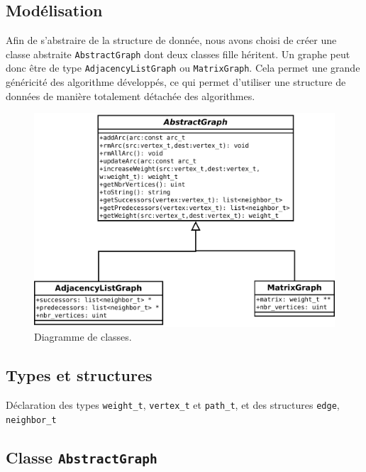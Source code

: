 \subsection{Modélisation}
Afin de s'abstraire de la structure de donnée, nous avons choisi de créer une classe abstraite \texttt{AbstractGraph} dont deux classes fille héritent. Un graphe peut donc être de type \texttt{AdjacencyListGraph} ou \texttt{MatrixGraph}. Cela permet une grande généricité des algorithme développés, ce qui permet d'utiliser une structure de données de manière totalement détachée des algorithmes.
\begin{figure}[t]
\begin{center}
\includegraphics[width=\textwidth]{files/diag_class}
\end{center}
\caption{Diagramme de classes.}
\end{figure}

\FloatBarrier

\subsection{Types et structures}

Déclaration des types \texttt{weight\_t}, \texttt{vertex\_t} et \texttt{path\_t}, et des structures \texttt{edge}, \texttt{neighbor\_t}



\subsection{Classe \texttt{AbstractGraph}}

